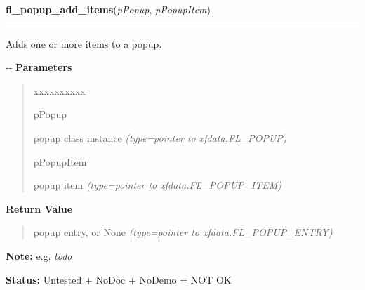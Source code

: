     \label{xformslib:flpopup:fl_popup_add_items}

    \vspace{0.5ex}

\hspace{.8\funcindent}\begin{boxedminipage}{\funcwidth}

    \raggedright \textbf{fl\_popup\_add\_items}(\textit{pPopup}, \textit{pPopupItem})

    \vspace{-1.5ex}

    \rule{\textwidth}{0.5\fboxrule}
\setlength{\parskip}{2ex}

Adds one or more items to a popup.

-{}-
\setlength{\parskip}{1ex}
      \textbf{Parameters}
      \vspace{-1ex}

      \begin{quote}
        \begin{Ventry}{xxxxxxxxxx}

          \item[pPopup]


popup class instance
            {\it (type=pointer to xfdata.FL\_POPUP)}

          \item[pPopupItem]


popup item
            {\it (type=pointer to xfdata.FL\_POPUP\_ITEM)}

        \end{Ventry}

      \end{quote}

      \textbf{Return Value}
    \vspace{-1ex}

      \begin{quote}

popup entry, or None
      {\it (type=pointer to xfdata.FL\_POPUP\_ENTRY)}

      \end{quote}

\textbf{Note:} 
e.g. \emph{todo}


\textbf{Status:} 
Untested + NoDoc + NoDemo = NOT OK


    \end{boxedminipage}

